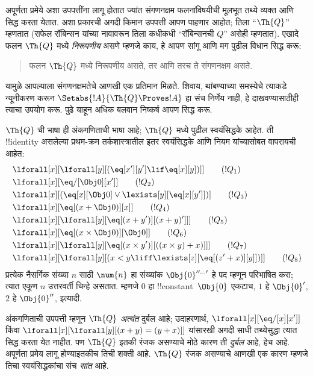 \documentclass[../../../include/open-logic-section]{subfiles}
\begin{document}

अपूर्णता प्रमेये अशा उपपत्तींना लागू होतात ज्यांत संगणनक्षम
फलनांविषयीची मूलभूत तथ्ये व्यक्त आणि सिद्ध करता येतात. अशा प्रकारची
अगदी किमान उपपत्ती आपण पाहणार आहोत; तिला ``$\Th{Q}$'' म्हणतात
(राफेल रॉबिन्सन यांच्या नावावरून तिला कधीकधी ``रॉबिन्सनची $Q$''
असेही म्हणतात). एखादे फलन $\Th{Q}$ मध्ये \emph{निरूपणीय} असणे म्हणजे
काय, हे आपण सांगू आणि मग पुढील विधान सिद्ध करू:
\begin{quote}
  फलन $\Th{Q}$ मध्ये निरूपणीय असते, तर आणि तरच ते संगणनक्षम असते.
\end{quote}
यामुळे आपल्याला संगणनक्षमतेचे आणखी एक प्रतिमान मिळते. शिवाय,
थांबण्याच्या समस्येचे त्याकडे न्यूनीकरण करून
$\Setabs{!A}{\Th{Q} \Proves !A}$ हा संच निर्णेय नाही, हे दाखवण्यासाठीही
त्याचा उपयोग करू. पुढे याहून अधिक बलवान निष्कर्ष आपण सिद्ध करू.

$\Th{Q}$ ची भाषा ही अंकगणिताची भाषा आहे; $\Th{Q}$ मध्ये पुढील
स्वयंसिद्धके आहेत. ती !!{identity} असलेल्या प्रथम-क्रम तर्कशास्त्रातील
इतर स्वयंसिद्धके आणि नियम यांच्यासोबत वापरायची आहेत:
\begin{align*}
& \lforall[x][\lforall[y][(\eq[x'][y'] \lif \eq[x][y])]] \tag{$!Q_1$}\\
& \lforall[x][\eq/[\Obj 0][x']] \tag{$!Q_2$}\\
& \lforall[x][(\eq[x][\Obj 0] \lor \lexists[y][\eq[x][y']])] \tag{$!Q_3$}\\
& \lforall[x][\eq[(x + \Obj 0)][x]] \tag{$!Q_4$}\\
& \lforall[x][\lforall[y][\eq[(x + y')][(x + y)']]] \tag{$!Q_5$}\\
& \lforall[x][\eq[(x \times \Obj 0)][\Obj 0]] \tag{$!Q_6$}\\
& \lforall[x][\lforall[y][\eq[(x \times y')][((x \times y) + x)]]] \tag{$!Q_7$}\\
& \lforall[x][\lforall[y][(x < y \liff \lexists[z][\eq[(z' + x)][y]])]] \tag{$!Q_8$}
\end{align*}
प्रत्येक नैसर्गिक संख्या $n$ साठी $\num{n}$ हा संख्यांक
$\Obj{0}^{\prime\prime\ldots\prime}$ हे पद म्हणून परिभाषित करा;
त्यात एकूण $n$ उत्तरवर्ती चिन्हे असतात. म्हणजे $\num{0}$ हा
!!{constant}~$\Obj{0}$ एकटाच, $\num{1}$ हे $\Obj{0}'$,
$\num{2}$ हे $\Obj{0}''$, इत्यादी.

अंकगणिताची उपपत्ती म्हणून $\Th{Q}$ \emph{अत्यंत} दुर्बल आहे;
उदाहरणार्थ, $\lforall[x][\eq/[x][x']]$ किंवा
$\lforall[x][\lforall[y][(x + y) = (y + x)]]$ यांसारखी
अगदी साधी तथ्येसुद्धा त्यात सिद्ध करता येत नाहीत. पण $\Th{Q}$
इतकी रंजक असण्याचे मोठे कारण ती \emph{दुर्बल} आहे, हेच आहे.
अपूर्णता प्रमेय लागू होण्याइतकीच तिची शक्ती आहे. $\Th{Q}$
रंजक असण्याचे आणखी एक कारण म्हणजे तिचा स्वयंसिद्धकांचा संच
\emph{सांत} आहे.
\end{document}

